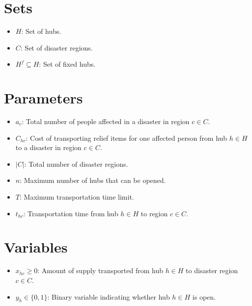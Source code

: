 \documentclass{article}
\begin{document}
\section{Sets}
\begin{itemize}[leftmargin=*,nosep]
    \item $H$: Set of hubs.
    \item $C$: Set of disaster regions.
    \item $H^f \subseteq H$: Set of fixed hubs.
\end{itemize}

\section{Parameters}
\begin{itemize}[leftmargin=*,nosep]
    \item $a_c$: Total number of people affected in a disaster in region $c \in C$.
    \item $C_{hc}$: Cost of transporting relief items for one affected person from hub $h \in H$ to a disaster in region $c \in C$.
    \item $|C|$: Total number of disaster regions.
    \item $n$: Maximum number of hubs that can be opened.
    \item $T$: Maximum transportation time limit.
    \item $t_{hc}$: Transportation time from hub $h \in H$ to region $c \in C$.
\end{itemize}

\section{Variables}
\begin{itemize}[leftmargin=*,nosep]
    \item $x_{hc} \geq 0$: Amount of supply transported from hub $h \in H$ to disaster region $c \in C$.
    \item $y_h \in \{0,1\}$: Binary variable indicating whether hub $h \in H$ is open.
\end{itemize}
\end{document}
